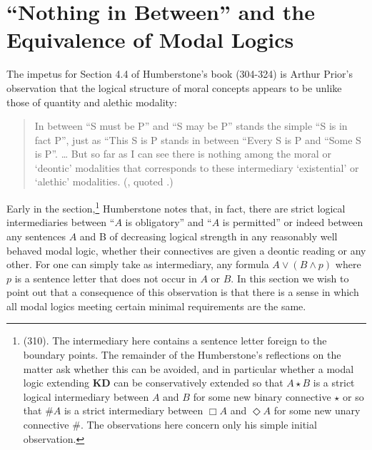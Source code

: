 \section{``Nothing in Between'' and the Equivalence of Modal Logics}
The impetus for Section 4.4 of Humberstone's book (304-324) is Arthur Prior's observation that the logical structure of moral concepts appears to be unlike those of quantity and alethic modality:
\begin{quote} In between ``S must be P'' and ``S may be P'' stands the simple ``S is in fact P'', just as ``This S is P stands in between ``Every S is P and ``Some S is P''. {\ldots} But so far as I can see there is nothing among the moral or `deontic' modalities that corresponds to these intermediary `existential' or `alethic' modalities. (\citet[145]{prior1951ethical}, quoted \citet[304]{Humberstone2016}.)
\end{quote}
Early in the section,\footnote{(310). The intermediary here contains a sentence letter foreign to the boundary points. The remainder of the Humberstone's reflections on the matter ask whether this can be avoided, and in particular whether a modal logic extending \textbf{KD} can be conservatively extended so that $A{\star}B$ is a strict logical intermediary between $A$ and $B$ for some new binary connective $\star$ or so that $\#A$ is a strict intermediary between $\Box{A}$ and ${\Diamond}A$ for some new unary connective $\#$. The observations here concern only his simple initial observation.} Humberstone notes that, in fact, there are strict logical intermediaries between ``$A$ is obligatory'' and ``$A$ is permitted'' or indeed between any sentences $A$ and B of decreasing logical strength in any reasonably well behaved modal logic, whether their connectives are given a deontic reading or any other. For one can simply take as intermediary, any formula $A\vee (B\wedge p)$ where $p$ is a sentence letter that does not occur in $A$ or $B$. In this section we wish to point out that a consequence of this observation is that there is a sense in which all modal logics meeting certain minimal requirements are the same. 

